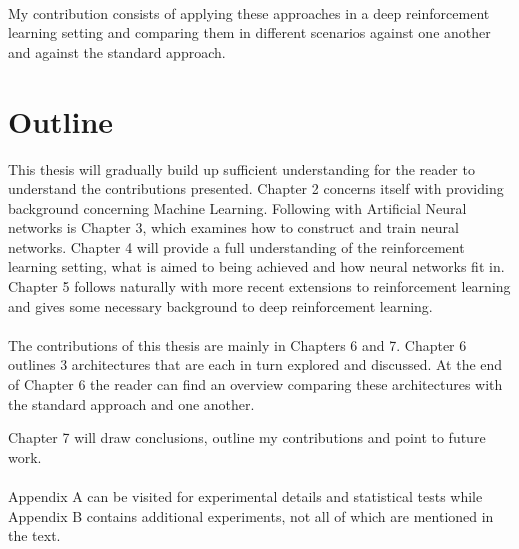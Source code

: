\paragraph{}
My contribution consists
of applying these approaches
in a deep reinforcement learning setting
and comparing them in different scenarios
against one another and against the standard approach.

\section{Outline}
\label{sec:outline}
This thesis will gradually build up sufficient understanding
for the reader to understand the contributions presented.
Chapter 2 concerns itself with providing background
concerning Machine Learning.
Following with Artificial Neural networks is Chapter 3,
which examines how to construct and train neural networks.
Chapter 4 will provide a full understanding of
the reinforcement learning setting,
what is aimed to being achieved
and how neural networks fit in.
Chapter 5 follows naturally
with more recent extensions
to reinforcement learning
and gives some necessary background
to deep reinforcement learning.

\paragraph{}
The contributions of this thesis are mainly in Chapters 6 and 7.
Chapter 6 outlines 3 architectures
that are each in turn explored and discussed.
At the end of Chapter 6 the reader can find an overview
comparing these architectures with the standard approach
and one another.

Chapter 7 will draw conclusions,
outline my contributions
and point to future work.

\paragraph{}
Appendix A can be visited for experimental details
and statistical tests
while Appendix B
contains additional experiments,
not all of which are mentioned in the text.
